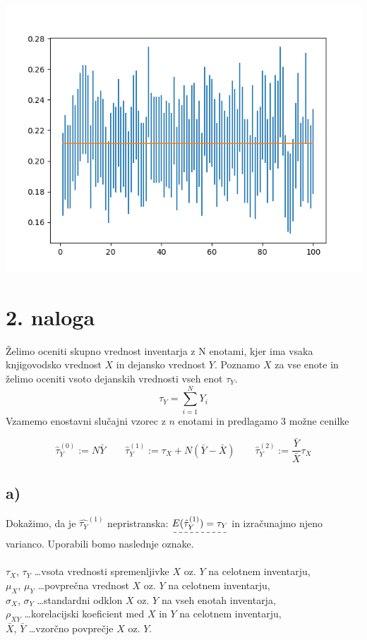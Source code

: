 \documentclass[A4paper, 11pt]{article}
\begin{document}
\includegraphics[scale=0.8]{Kibergrad_2}



\section*{2. naloga}

Želimo oceniti skupno vrednost inventarja z N enotami, kjer ima vsaka knjigovodsko vrednost $X$ in dejansko vrednost $Y$. Poznamo $X$ za vse enote in želimo oceniti vsoto dejanskih vrednosti vseh enot $\tau_Y$.
\[ \tau_Y = \sum_{i=1}^{N} Y_i \]
Vzamemo enostavni slučajni vzorec z $n$ enotami in predlagamo 3 možne cenilke

\[ \hat{\tau}_Y ^ {(0)} := N  \bar{Y} \qquad \hat{\tau}_Y ^ {(1)} := \tau_X + N ( \bar{Y} - \bar{X}) \qquad \hat{\tau}_Y ^ {(2)} := \frac{\bar{Y}}{\bar{X}} \tau_X \]

\subsection*{a)}
Dokažimo, da je $\hat{\tau_Y} ^ {(1)}$ nepristranska: $\dashuline{ E(\hat{\tau}_Y ^ {(1)}) = \tau_Y}$ in izračunajmo njeno varianco. Uporabili bomo naslednje oznake. \\
\\
$\tau_X$, $\tau_Y$ \ldots vsota vrednosti spremenljivke $X$ oz. $Y$ na celotnem inventarju, \\
$\mu_X$, $\mu_Y$ \ldots povprečna vrednost $X$ oz. $Y$ na celotnem inventarju, \\
$\sigma_X$, $\sigma_Y$ \ldots standardni odklon $X$ oz. $Y$ na vseh enotah inventarja, \\
$\rho_{XY}$ \ldots korelacijski koeficient med $X$ in $Y$ na celotnem inventarju, \\
$\bar{X}$, $\bar{Y}$ \ldots vzorčno povprečje $X$ oz. $Y$.
\end{document}
